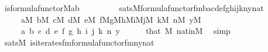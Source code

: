\begin{isabellebody}
\ {\isachardoublequoteopen}is{\isacharunderscore}{\kern0pt}formula{\isacharunderscore}{\kern0pt}functor{\isacharparenleft}{\kern0pt}{\isacharhash}{\kern0pt}{\isacharhash}{\kern0pt}M{\isacharcomma}{\kern0pt}a{\isacharcomma}{\kern0pt}b{\isacharparenright}{\kern0pt}\ {\isasymlongleftrightarrow}\isanewline
\ \ \ \ \ \ \ \ sats{\isacharparenleft}{\kern0pt}M{\isacharcomma}{\kern0pt}formula{\isacharunderscore}{\kern0pt}functor{\isacharunderscore}{\kern0pt}fm{\isacharparenleft}{\kern0pt}{}{\isacharcomma}{\kern0pt}{}{\isacharparenright}{\kern0pt}{\isacharcomma}{\kern0pt}{\isacharbrackleft}{\kern0pt}b{\isacharcomma}{\kern0pt}a{\isacharcomma}{\kern0pt}c{\isacharcomma}{\kern0pt}d{\isacharcomma}{\kern0pt}e{\isacharcomma}{\kern0pt}f{\isacharcomma}{\kern0pt}g{\isacharcomma}{\kern0pt}h{\isacharcomma}{\kern0pt}i{\isacharcomma}{\kern0pt}j{\isacharcomma}{\kern0pt}k{\isacharcomma}{\kern0pt}n{\isacharcomma}{\kern0pt}y{\isacharcomma}{\kern0pt}{}{\isacharcomma}{\kern0pt}nat{\isacharbrackright}{\kern0pt}{\isacharparenright}{\kern0pt}{\isachardoublequoteclose}\isanewline
\ \ \ \ \ {\isachardoublequoteopen}a{\isasymin}M{\isachardoublequoteclose}\ {\isachardoublequoteopen}b{\isasymin}M{\isachardoublequoteclose}\ {\isachardoublequoteopen}c{\isasymin}M{\isachardoublequoteclose}\ {\isachardoublequoteopen}d{\isasymin}M{\isachardoublequoteclose}\ {\isachardoublequoteopen}e{\isasymin}M{\isachardoublequoteclose}\ {\isachardoublequoteopen}f{\isasymin}M{\isachardoublequoteclose}{\isachardoublequoteopen}g{\isasymin}M{\isachardoublequoteclose}{\isachardoublequoteopen}h{\isasymin}M{\isachardoublequoteclose}{\isachardoublequoteopen}i{\isasymin}M{\isachardoublequoteclose}{\isachardoublequoteopen}j{\isasymin}M{\isachardoublequoteclose}\ {\isachardoublequoteopen}k{\isasymin}M{\isachardoublequoteclose}\ {\isachardoublequoteopen}n{\isasymin}M{\isachardoublequoteclose}\ {\isachardoublequoteopen}y{\isasymin}M{\isachardoublequoteclose}\isanewline
\ \ \ \ \ a\ b\ c\ d\ e\ f\ g\ h\ i\ j\ k\ n\ y\isanewline
\ \ \ \ \isamarkupfalse%
\ that\ {\isacartoucheopen}{}{\isasymin}M{\isacartoucheclose}\ nat{\isacharunderscore}{\kern0pt}in{\isacharunderscore}{\kern0pt}M\ \isamarkupfalse%
\ simp\isanewline
\ \ \isamarkupfalse%
\isanewline
\ \ \isamarkupfalse%
\ {}{\isacharcolon}{\kern0pt}{\isachardoublequoteopen}sats{\isacharparenleft}{\kern0pt}M{\isacharcomma}{\kern0pt}\ is{\isacharunderscore}{\kern0pt}iterates{\isacharunderscore}{\kern0pt}fm{\isacharparenleft}{\kern0pt}formula{\isacharunderscore}{\kern0pt}functor{\isacharunderscore}{\kern0pt}fm{\isacharparenleft}{\kern0pt}{}{\isacharcomma}{\kern0pt}{}{\isacharparenright}{\kern0pt}{\isacharcomma}{\kern0pt}{}{\isacharcomma}{\kern0pt}{}{\isacharcomma}{\kern0pt}{}{\isacharparenright}{\kern0pt}{\isacharcomma}{\kern0pt}{\isacharbrackleft}{\kern0pt}n{\isacharcomma}{\kern0pt}y{\isacharcomma}{\kern0pt}{}{\isacharcomma}{\kern0pt}nat{\isacharbrackright}{\kern0pt}\ {\isacharparenright}{\kern0pt}\ {\isasymlongleftrightarrow}\isanewline

\end{isabellebody}
